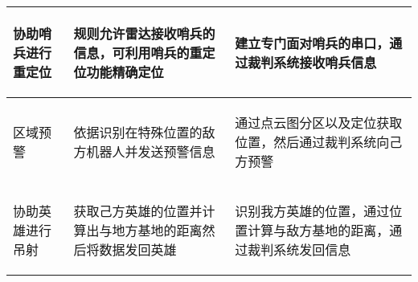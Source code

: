 \begin{longtable}{ p{2cm} | p{7.8cm} | p{6cm} |}
    \hline
    
        \begin{center}
            协助哨兵进行重定位
        \end{center} \cellcolor{gndcolor} &
        \begin{center}
            规则允许雷达接收哨兵的信息，可利用哨兵的重定位功能精确定位
        \end{center} \cellcolor{gndcolor} &
        \begin{center}
            建立专门面对哨兵的串口，通过裁判系统接收哨兵信息
        \end{center} \cellcolor{gndcolor} \\

    \hline
    
        \begin{center}
           区域预警
        \end{center} &
        \begin{center}
            依据识别在特殊位置的敌方机器人并发送预警信息
        \end{center} &
        \begin{center}
            通过点云图分区以及定位获取位置，然后通过裁判系统向己方预警
        \end{center} \\
        
    \hline
    
        \begin{center}
            协助英雄进行吊射
        \end{center} &
        \begin{center}
            获取己方英雄的位置并计算出与地方基地的距离然后将数据发回英雄
        \end{center} &
        \begin{center}
            识别我方英雄的位置，通过位置计算与敌方基地的距离，通过裁判系统发回信息
        \end{center} \\
        
    \hline
    
\end{longtable}
